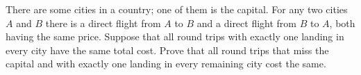 There are some cities in a country; one of them is the capital. For any two cities $A$ and $B$ there is a direct flight from $A$ to $B$ and a direct flight from $B$ to $A$,  both having the same price. Suppose that all round trips with exactly one landing in every city have the same total cost. Prove that all round trips that miss the capital and with exactly one landing in every remaining city cost the same.